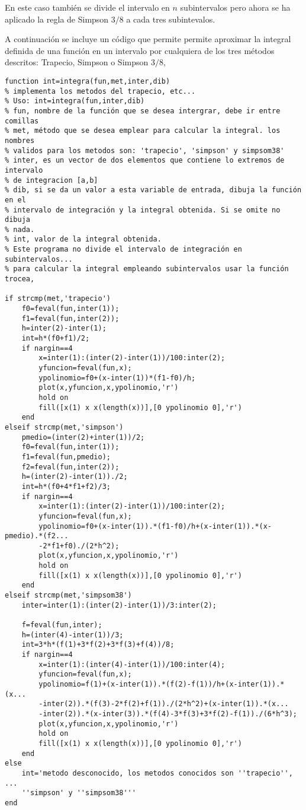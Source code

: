 En este caso también se divide el intervalo en $n$ subintervalos pero ahora se ha aplicado la regla de Simpson $3/8$ a cada tres subintevalos.

A continuación se incluye un código que permite permite aproximar la integral definida de una función en un intervalo por cualquiera de los tres métodos descritos: Trapecio, Simpson o Simpson $3/8$,

\begin{lstlisting}
function int=integra(fun,met,inter,dib)
% implementa los metodos del trapecio, etc...
% Uso: int=integra(fun,inter,dib)
% fun, nombre de la función que se desea intergrar, debe ir entre comillas
% met, método que se desea emplear para calcular la integral. los nombres
% validos para los metodos son: 'trapecio', 'simpson' y simpsom38'
% inter, es un vector de dos elementos que contiene lo extremos de intervalo
% de integracion [a,b]
% dib, si se da un valor a esta variable de entrada, dibuja la función en el
% intervalo de integración y la integral obtenida. Si se omite no dibuja
% nada.
% int, valor de la integral obtenida.
% Este programa no divide el intervalo de integración en subintervalos...
% para calcular la integral empleando subintervalos usar la función trocea,

if strcmp(met,'trapecio')
    f0=feval(fun,inter(1));
    f1=feval(fun,inter(2));
    h=inter(2)-inter(1);
    int=h*(f0+f1)/2;
    if nargin==4
        x=inter(1):(inter(2)-inter(1))/100:inter(2);
        yfuncion=feval(fun,x);
        ypolinomio=f0+(x-inter(1))*(f1-f0)/h;
        plot(x,yfuncion,x,ypolinomio,'r')
        hold on
        fill([x(1) x x(length(x))],[0 ypolinomio 0],'r') 
    end
elseif strcmp(met,'simpson')
    pmedio=(inter(2)+inter(1))/2;
    f0=feval(fun,inter(1));
    f1=feval(fun,pmedio);
    f2=feval(fun,inter(2));
    h=(inter(2)-inter(1))./2;
    int=h*(f0+4*f1+f2)/3;
    if nargin==4
        x=inter(1):(inter(2)-inter(1))/100:inter(2);
        yfuncion=feval(fun,x);
        ypolinomio=f0+(x-inter(1)).*(f1-f0)/h+(x-inter(1)).*(x-pmedio).*(f2...
        -2*f1+f0)./(2*h^2);
        plot(x,yfuncion,x,ypolinomio,'r')
        hold on
        fill([x(1) x x(length(x))],[0 ypolinomio 0],'r') 
    end        
elseif strcmp(met,'simpsom38')
    inter=inter(1):(inter(2)-inter(1))/3:inter(2);

    f=feval(fun,inter);
    h=(inter(4)-inter(1))/3;
    int=3*h*(f(1)+3*f(2)+3*f(3)+f(4))/8;
    if nargin==4
        x=inter(1):(inter(4)-inter(1))/100:inter(4);
        yfuncion=feval(fun,x);
        ypolinomio=f(1)+(x-inter(1)).*(f(2)-f(1))/h+(x-inter(1)).*(x...
        -inter(2)).*(f(3)-2*f(2)+f(1))./(2*h^2)+(x-inter(1)).*(x...
        -inter(2)).*(x-inter(3)).*(f(4)-3*f(3)+3*f(2)-f(1))./(6*h^3);
        plot(x,yfuncion,x,ypolinomio,'r')
        hold on
        fill([x(1) x x(length(x))],[0 ypolinomio 0],'r') 
    end
else
    int='metodo desconocido, los metodos conocidos son ''trapecio'', ...
    ''simpson' y ''simpsom38'''
end
\end{lstlisting}

